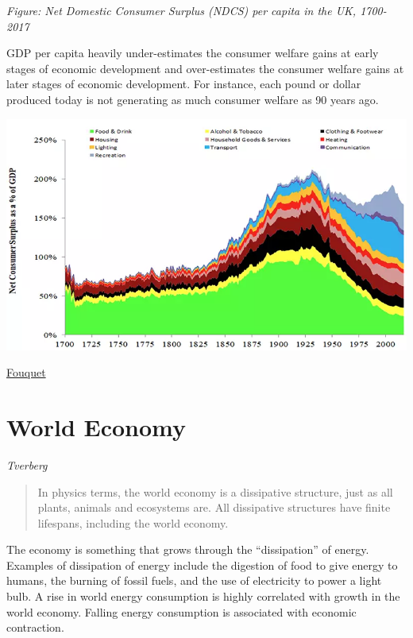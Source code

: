 \documentclass[
]{book}
\begin{document}
\emph{Figure: Net Domestic Consumer Surplus (NDCS) per capita in the UK, 1700-2017}

GDP per capita heavily under-estimates the consumer welfare gains at early stages of economic development and over-estimates the consumer welfare gains at later stages of economic development. For instance, each pound or dollar produced today is not generating as much consumer welfare as 90 years ago.

\includegraphics{fig/net_domestic_consumer_surplus_vs_gdp.png}

\href{https://www.lse.ac.uk/granthaminstitute/roger-fouquet-research-in-progress/}{Fouquet}

\hypertarget{world-economy}{%
\chapter{World Economy}\label{world-economy}}

\emph{Tverberg}

\begin{quote}
In physics terms, the world economy is a dissipative structure, just as all plants, animals and ecosystems are. All dissipative structures have finite lifespans, including the world economy.
\end{quote}

The economy is something that grows through the ``dissipation'' of energy. Examples of dissipation of energy include the digestion of food to give energy to humans, the burning of fossil fuels, and the use of electricity to power a light bulb. A rise in world energy consumption is highly correlated with growth in the world economy. Falling energy consumption is associated with economic contraction.
\end{document}
